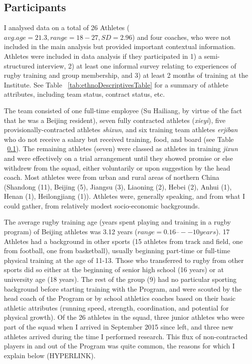   \subsection{Participants}
  I analysed data on a total of 26 Athletes ($avg. age = 21.3, range = 18-27, SD = 2.96$) and four coaches, who were not included in the main analysis but provided important contextual information.  Athletes were included in data analysis if they participated in 1) a semi-structured interview, 2) at least one informal survey relating to experiences of rugby training and group membership, and 3) at least 2 months of training at the Institute.  See Table ~\ref{tab:ethnoDescriptivesTable} for a summary of athlete attributes, including team status, contract status, etc.

  

  The team consisted of one full-time employee (Su Hailiang, by virtue of the fact that he was a Beijing resident), seven fully contracted athletes (\textit{xieyi}), five provisionally-contracted athletes \textit{shixun}, and six training team athletes \textit{erjiban} who do not receive a salary but received training, food, and board (see Table ~\ref{}).  The remaining athletes (seven) were classed as athletes in training \textit{jixun} and were effectively on a trial arrangement until they showed promise or else withdrew from the squad, either voluntarily or upon suggestion by the head coach.  Most athletes were from urban and rural areas of northern China (Shandong (11), Beijing (5), Jiangsu (3), Liaoning (2), Hebei (2), Anhui (1), Henan (1), Heilongjiang (1)). Athletes were, generally speaking, and from what I could gather, from relatively modest socio-economic backgrounds.

  The average rugby training age (years spent playing and training in a rugby program) of Beijing athletes was 3.12 years ($range = 0.16 –-- 10 years$).  17 Athletes had a background in other sports (15 athletes from track and field, one from football, one from basketball), usually beginning part-time or full-time physical training at the age of 11-13.  Those who transferred to rugby from other sports did so either at the beginning of senior high school (16 years) or at university age (18 years).  The rest of the group (9) had no particular sporting background before starting training with the Program, and were scouted by the head coach of the Program or by school athletics coaches based on their basic athletic attributes (running speed, strength, coordination, and potential for physical growth).  Of the 26 athletes in the squad, three junior athletes who were part of the squad when I arrived in September 2015 since left, and three new athletes arrived during the time I performed research. This flux of non-contracted players in and out of the Program was quite common, the reasons for which I explain below (HYPERLINK).

